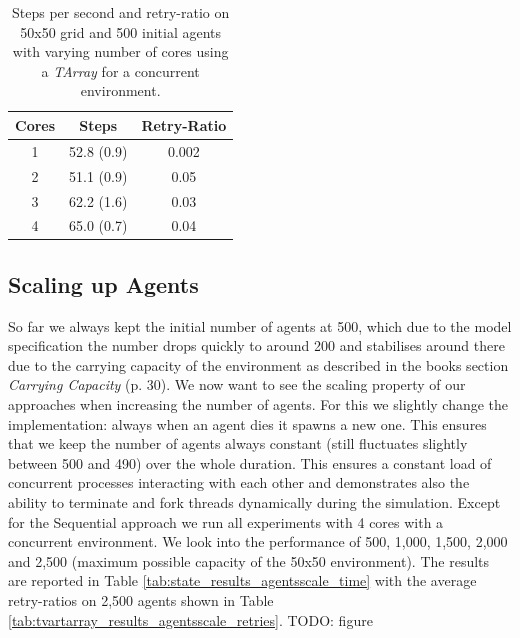 \begin{table}
	\centering
  	\begin{tabular}{ c || c | c }
        Cores & Steps       & Retry-Ratio \\ \hline \hline 
    	1     & 52.8 (0.9)  & 0.002 	  \\ \hline
   		2     & 51.1 (0.9)  & 0.05 		  \\ \hline
   		3     & 62.2 (1.6)  & 0.03		  \\ \hline
   		4     &  65.0 (0.7) & 0.04
   	\end{tabular}
  	
  	\caption{Steps per second and retry-ratio on 50x50 grid and 500 initial agents with varying number of cores using a \textit{TArray} for a concurrent environment.}
	\label{tab:tarray_results_concenv_time}
\end{table}

\subsection{Scaling up Agents}
So far we always kept the initial number of agents at 500, which due to the model specification the number drops quickly to around 200 and stabilises around there due to the carrying capacity of the environment as described in the books \cite{epstein_growing_1996} section \textit{Carrying Capacity} (p. 30). We now want to see the scaling property of our approaches when increasing the number of agents. For this we slightly change the implementation: always when an agent dies it spawns a new one. This ensures that we keep the number of agents always constant (still fluctuates slightly between 500 and 490) over the whole duration. This ensures a constant load of concurrent processes interacting with each other and demonstrates also the ability to terminate and fork threads dynamically during the simulation.
Except for the Sequential approach we run all experiments with 4 cores with a concurrent environment. We look into the performance of 500, 1,000, 1,500, 2,000 and 2,500 (maximum possible capacity of the 50x50 environment). The results are reported in Table \ref{tab:state_results_agentsscale_time} with the average retry-ratios on 2,500 agents shown in Table \ref{tab:tvartarray_results_agentsscale_retries}. TODO: figure


